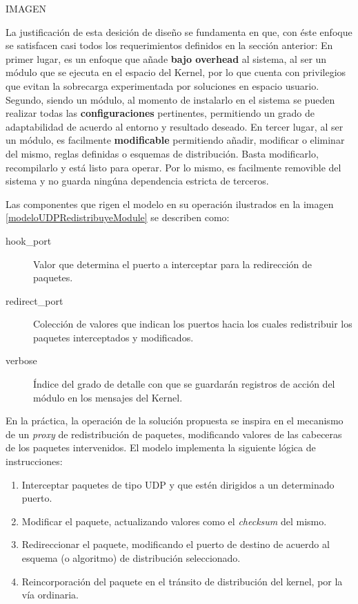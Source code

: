 IMAGEN

La justificación de esta desición de diseño se fundamenta en que, con éste enfoque se satisfacen casi todos los requerimientos definidos en la sección anterior: En primer lugar, es un enfoque que añade \textbf{bajo overhead} al sistema, al ser un módulo que se ejecuta en el espacio del Kernel, por lo que cuenta con privilegios que evitan la sobrecarga experimentada por soluciones en espacio usuario. Segundo, siendo un módulo, al momento de instalarlo en el sistema se pueden realizar todas las \textbf{configuraciones} pertinentes, permitiendo un grado de adaptabilidad de acuerdo al entorno y resultado deseado. En tercer lugar, al ser un módulo, es facilmente \textbf{modificable} permitiendo añadir, modificar o eliminar del mismo, reglas definidas o esquemas de distribución. Basta modificarlo, recompilarlo y está listo para operar. Por lo mismo, es facilmente removible del sistema y no guarda ningúna dependencia estricta de terceros.

Las componentes que rigen el modelo en su operación ilustrados en la imagen \ref{modeloUDPRedistribuyeModule} se describen como:

\begin{description}
\item[hook\_port] Valor que determina el puerto a interceptar para la redirección de paquetes.
\item[redirect\_port] Colección de valores que indican los puertos hacia los cuales redistribuir los paquetes interceptados y modificados.
\item[verbose] Índice del grado de detalle con que se guardarán registros de acción del módulo en los mensajes del Kernel.
\end{description}


En la práctica, la operación de la solución propuesta se inspira en el mecanismo de un \emph{proxy} de redistribución de paquetes, modificando valores de las cabeceras de los paquetes intervenidos. El modelo implementa la siguiente lógica de instrucciones:

\begin{enumerate}
\item Interceptar paquetes de tipo UDP y que estén dirigidos a un determinado puerto.
\item Modificar el paquete, actualizando valores como el \emph{checksum} del mismo.
\item Redireccionar el paquete, modificando el puerto de destino de acuerdo al esquema (o algoritmo) de distribución seleccionado.
\item Reincorporación del paquete en el tránsito de distribución del kernel, por la vía ordinaria.
\end{enumerate}

